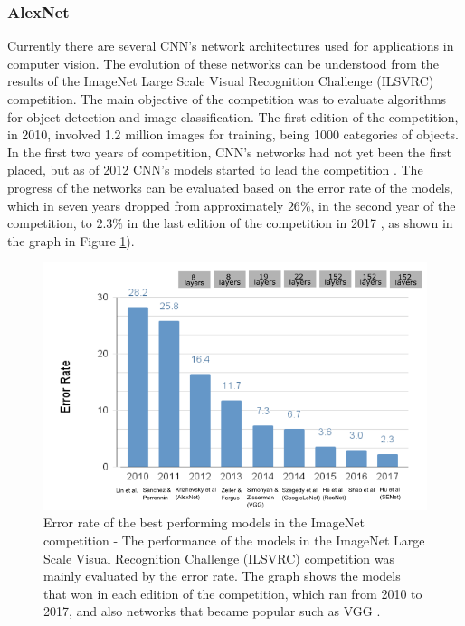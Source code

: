 \subsubsection{AlexNet}

Currently there are several CNN's network architectures used for applications in computer vision. The evolution of these networks can be understood from the results of the ImageNet Large Scale Visual Recognition Challenge (ILSVRC) competition. The main objective of the competition was to evaluate algorithms for object detection and image classification. The first edition of the competition, in 2010, involved 1.2 million images for training, being 1000 categories of objects. In the first two years of competition, CNN's networks had not yet been the first placed, but as of 2012 CNN's models started to lead the competition \cite{imagenet2020}. The progress of the networks can be evaluated based on the error rate of the models, which in seven years dropped from approximately $26\%$, in the second year of the competition, to $2.3\%$ in the last edition of the competition in 2017 \cite{johnson2019}, as shown in the graph in Figure \ref{fig:imagenet}).


\begin{figure}
    \centering
    \includegraphics[scale=0.4]{"Part 3 - Learning Systems/Supervised Learning/Deep Learning/images/figure127.png"}
    \caption{ Error rate of the best performing models in the ImageNet competition - The performance of the models in the ImageNet Large Scale Visual Recognition Challenge (ILSVRC) competition was mainly evaluated by the error rate. The graph shows the models that won in each edition of the competition, which ran from 2010 to 2017, and also networks that became popular such as VGG \cite{johnson2019}.}
    \label{fig:imagenet}
\end{figure}

